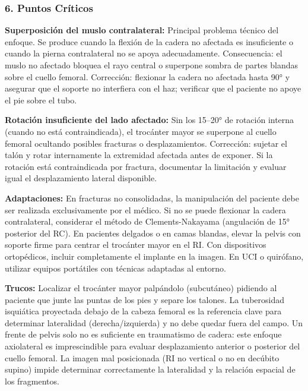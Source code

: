 	\subsubsection*{6. Puntos Críticos}
	
	\textbf{Superposición del muslo contralateral:} Principal problema técnico del enfoque. Se produce cuando la flexión de la cadera no afectada es insuficiente o cuando la pierna contralateral no se apoya adecuadamente. Consecuencia: el muslo no afectado bloquea el rayo central o superpone sombra de partes blandas sobre el cuello femoral. Corrección: flexionar la cadera no afectada hasta 90° y asegurar que el soporte no interfiera con el haz; verificar que el paciente no apoye el pie sobre el tubo.
	
	\textbf{Rotación insuficiente del lado afectado:} Sin los 15--20° de rotación interna (cuando no está contraindicada), el trocánter mayor se superpone al cuello femoral ocultando posibles fracturas o desplazamientos. Corrección: sujetar el talón y rotar internamente la extremidad afectada antes de exponer. Si la rotación está contraindicada por fractura, documentar la limitación y evaluar igual el desplazamiento lateral disponible.
	
	\textbf{Adaptaciones:} En fracturas no consolidadas, la manipulación del paciente debe ser realizada exclusivamente por el médico. Si no se puede flexionar la cadera contralateral, considerar el método de Clements-Nakayama (angulación de 15° posterior del RC). En pacientes delgados o en camas blandas, elevar la pelvis con soporte firme para centrar el trocánter mayor en el RI. Con dispositivos ortopédicos, incluir completamente el implante en la imagen. En UCI o quirófano, utilizar equipos portátiles con técnicas adaptadas al entorno.
	
	\textbf{Trucos:} Localizar el trocánter mayor palpándolo (subcutáneo) pidiendo al paciente que junte las puntas de los pies y separe los talones. La tuberosidad isquiática proyectada debajo de la cabeza femoral es la referencia clave para determinar lateralidad (derecha/izquierda) y no debe quedar fuera del campo. Un frente de pelvis solo no es suficiente en traumatismo de cadera: este enfoque axiolateral es imprescindible para evaluar desplazamiento anterior o posterior del cuello femoral. La imagen mal posicionada (RI no vertical o no en decúbito supino) impide determinar correctamente la lateralidad y la relación espacial de los fragmentos.
	
	\clearpage
	\onecolumn
	
